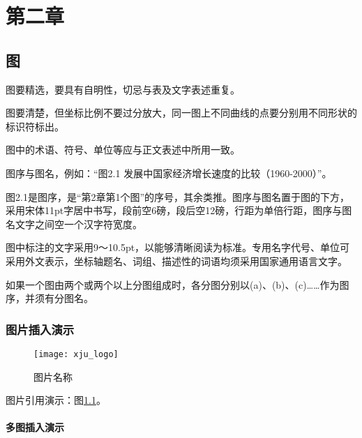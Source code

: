 \chapter{第二章}

\section{图}

图要精选，要具有自明性，切忌与表及文字表述重复。

图要清楚，但坐标比例不要过分放大，同一图上不同曲线的点要分别用不同形状的标识符标出。

图中的术语、符号、单位等应与正文表述中所用一致。

图序与图名，例如：“图2.1  发展中国家经济增长速度的比较（1960-2000）”。

图2.1是图序，是“第2章第1个图”的序号，其余类推。图序与图名置于图的下方，采用宋体11pt字居中书写，段前空6磅，段后空12磅，行距为单倍行距，图序与图名文字之间空一个汉字符宽度。

图中标注的文字采用9～10.5pt，以能够清晰阅读为标准。专用名字代号、单位可采用外文表示，坐标轴题名、词组、描述性的词语均须采用国家通用语言文字。

如果一个图由两个或两个以上分图组成时，各分图分别以(a)、(b)、(c)……作为图序，并须有分图名。



\subsection{图片插入演示}

\begin{figure}[hbt]
	\centering
	\texttt{[image: xju\_logo]}
	\caption{图片名称}
	\label{xju_logo}
\end{figure}

图片引用演示：图\ref{xju_logo}。

\subsubsection{多图插入演示}


